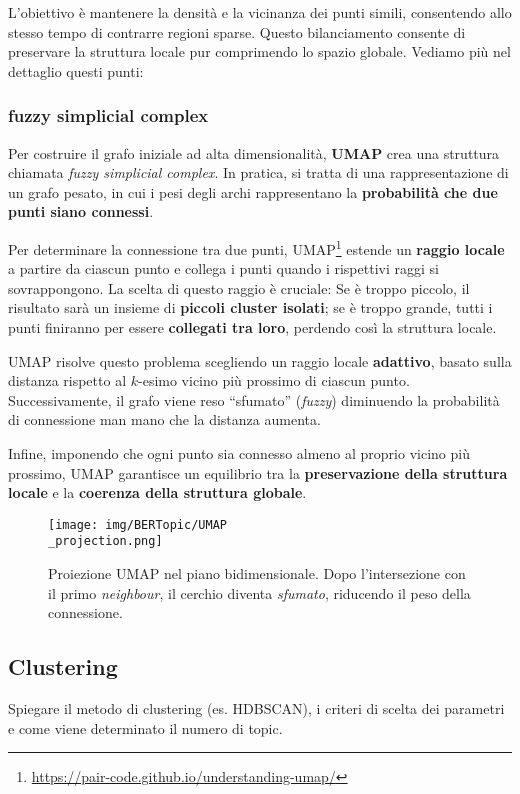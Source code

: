 L'obiettivo è mantenere la densità e la vicinanza dei punti simili, consentendo allo stesso tempo di contrarre regioni sparse.
Questo bilanciamento consente di preservare la struttura locale pur comprimendo lo spazio globale.
Vediamo più nel dettaglio questi punti:
\subsubsection{fuzzy simplicial complex}
Per costruire il grafo iniziale ad alta dimensionalità, \textbf{UMAP} crea una struttura chiamata \textit{fuzzy simplicial complex}. In pratica, si tratta di una rappresentazione di un grafo pesato, in cui i pesi degli archi rappresentano la \textbf{probabilità che due punti siano connessi}.

Per determinare la connessione tra due punti, UMAP\footnote{\url{https://pair-code.github.io/understanding-umap/}} estende un \textbf{raggio locale} a partire da ciascun punto e collega i punti quando i rispettivi raggi si sovrappongono. La scelta di questo raggio è cruciale:
Se è troppo piccolo, il risultato sarà un insieme di \textbf{piccoli cluster isolati};
se è troppo grande, tutti i punti finiranno per essere \textbf{collegati tra loro}, perdendo così la struttura locale.

UMAP risolve questo problema scegliendo un raggio locale \textbf{adattivo}, basato sulla distanza rispetto al $k$-esimo vicino più prossimo di ciascun punto. Successivamente, il grafo viene reso ``sfumato'' (\textit{fuzzy}) diminuendo la probabilità di connessione man mano che la distanza aumenta.

Infine, imponendo che ogni punto sia connesso almeno al proprio vicino più prossimo, UMAP garantisce un equilibrio tra la \textbf{preservazione della struttura locale} e la \textbf{coerenza della struttura globale}.

\begin{figure}[H]
\centering
\texttt{[image: img/BERTopic/UMAP\\\_projection.png]}
\caption{Proiezione UMAP nel piano bidimensionale. Dopo l'intersezione con il primo \emph{neighbour}, il cerchio diventa \emph{sfumato}, riducendo il peso della connessione.\protect\footnotemark}
\label{fig:umap-projection}
\end{figure}

\subsection{Clustering}
Spiegare il metodo di clustering (es. HDBSCAN), i criteri di scelta dei parametri e come viene determinato il numero di topic.

